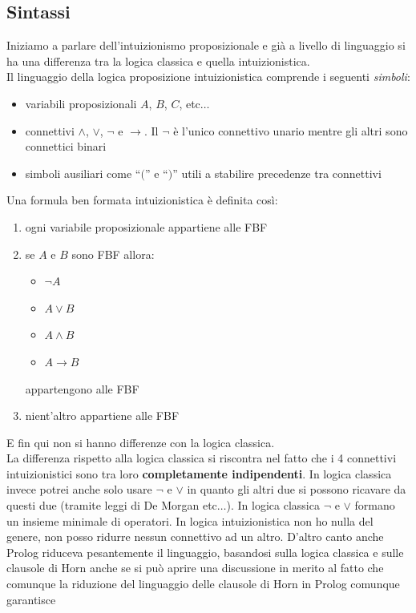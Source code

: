 \documentclass[a4paper,12pt, oneside]{book}
\begin{document}
\subsection{Sintassi}
Iniziamo a parlare dell'intuizionismo proposizionale e già a livello di
linguaggio si ha una differenza tra la logica classica e quella
intuizionistica.\\
Il linguaggio della logica proposizione intuizionistica comprende i seguenti
\textit{simboli}: 
\begin{itemize}
  \item variabili proposizionali $A$, $B$, $C$, etc$\ldots$
  \item connettivi $\land$, $\lor$, $\neg$ e $\to$. Il $\neg$ è l'unico
  connettivo unario mentre gli altri sono connettici binari
  \item simboli ausiliari come ``$($'' e ``$)$'' utili a stabilire precedenze
  tra connettivi 
\end{itemize}
Una formula ben formata intuizionistica è definita così:
\begin{enumerate}
  \item ogni variabile proposizionale appartiene alle FBF
  \item se $A$ e $B$ sono FBF allora:
  \begin{itemize}
    \item $\neg A$
    \item $A\lor B$
    \item $A\land B$
    \item $A\to B$
  \end{itemize}
  appartengono alle FBF
  \item nient'altro appartiene alle FBF
\end{enumerate}
E fin qui non si hanno differenze con la logica classica.\\
La differenza rispetto alla logica classica si riscontra nel fatto che i 4
connettivi intuizionistici sono tra loro \textbf{completamente indipendenti}. In
logica classica invece potrei anche solo usare $\neg$ e $\lor$ in quanto gli
altri due si possono ricavare da questi due (tramite leggi di De Morgan
etc$\ldots$). In logica classica $\neg$ e $\lor$ formano un insieme minimale di
operatori. In logica intuizionistica non ho nulla del genere, non posso ridurre
nessun connettivo ad un altro. D'altro canto anche Prolog riduceva pesantemente
il linguaggio, basandosi sulla logica classica e sulle clausole di Horn anche
se si può aprire una discussione in merito al fatto che comunque la riduzione
del linguaggio delle clausole di Horn in Prolog comunque garantisce
\end{document}
